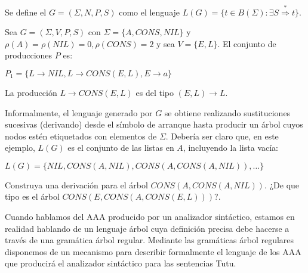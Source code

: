 \begin{definition}
Se define el  $G = (\Sigma, N, P, S)$
como el lenguaje $L(G) = \{ t \in B(\Sigma): \exists S \stackrel{*}{\Longrightarrow} t \}$.
\end{definition}

\begin{example}
\label{example:listtreegrammar}
Sea $G = (\Sigma, V, P, S)$ con
$\Sigma = \{A, CONS, NIL \}$ y $\rho(A) = \rho(NIL) = 0, \rho(CONS) = 2$
y sea $V = \{ E, L \}$. El conjunto de producciones $P$ es:

\begin{center}
$P_1 = \{ L \rightarrow NIL, L \rightarrow CONS(E,L),E \rightarrow a \}$
\end{center}

La producción $L \rightarrow CONS(E,L)$ es del tipo $(E,L) \rightarrow L$. 

Informalmente, el lenguaje generado por $G$ se obtiene realizando sustituciones
sucesivas (derivando) desde el símbolo de arranque hasta producir un
árbol cuyos nodos estén etiquetados con elementos de $\Sigma$. Debería ser claro
que, en este ejemplo, $L(G)$ es el conjunto de las listas en $A$, incluyendo la lista vacía:

\begin{center}
$L(G) = \{ NIL, CONS(A, NIL), CONS(A, CONS(A,NIL)), \ldots \}$
\end{center}

\end{example}

\begin{exercise} 
Construya una derivación para el árbol $CONS(A, CONS(A,NIL))$.
¿De que tipo es el árbol $CONS(E, CONS(A, CONS(E,L)))$?.
\end{exercise}

Cuando hablamos del AAA producido por un analizador sintáctico,
estamos en realidad hablando de un lenguaje árbol cuya definición 
precisa debe hacerse a través de una gramática
árbol regular.
Mediante las gramáticas árbol regulares disponemos de un mecanismo para
describir formalmente el lenguaje de los 
AAA que producirá el analizador sintáctico
para las sentencias Tutu.

